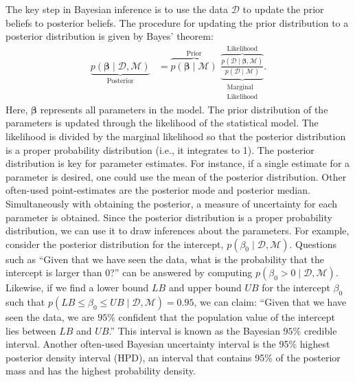 \documentclass[man, mask]{apa7}
\newcommand{\prob}[1]{p\left(#1\right)}
\newcommand{\lik}[1]{p\left(#1\right)}
\newcommand{\data}{\mathcal{D}}
\newcommand{\model}{\mathcal{M}}
\begin{document}
The key step in Bayesian inference is to use the data $\data$ to update the prior beliefs to posterior beliefs.
The procedure for updating the prior distribution to a posterior distribution is given by Bayes' theorem:
\begin{align*}\label{eq:BayesTheorem}
\underbrace{\prob{\bm{\beta} \mid \data , \model}}_{\text{Posterior}}
&=
\overbrace{\prob{\bm{\beta}\mid \model}}^{\text{Prior}}
\,\,
\underbrace{\overbrace{
		\frac{\lik{\data \mid \bm{\beta}, \model}}{\prob{\data \mid \model}}
	}^{\text{Likelihood}}}_{\substack{\text{Marginal}\\ \text{Likelihood}}}.
\end{align*}
Here, $\bm{\beta}$ represents all parameters in the model. The prior distribution of the parameters is updated through the likelihood of the statistical model. The likelihood is divided by the marginal likelihood so that the posterior distribution is a proper probability distribution (i.e., it integrates to 1). The posterior distribution is key for parameter estimates. For instance, if a single estimate for a parameter is desired, one could use the mean of the posterior distribution. Other often-used point-estimates are the posterior mode and posterior median. Simultaneously with obtaining the posterior, a measure of uncertainty for each parameter is obtained. Since the posterior distribution is a proper probability distribution, we can use it to draw inferences about the parameters. For example, consider the posterior distribution for the intercept, $\prob{\beta_0 \mid \data , \model}$. Questions such as ``Given that we have seen the data, what is the probability that the intercept is larger than 0?'' can be answered by computing $\prob{\beta_0 > 0 \mid \data , \model}$. Likewise, if we find a lower bound $LB$ and upper bound $UB$ for the intercept $\beta_0$ such that $\prob{ LB \leq \beta_0 \leq UB \mid \data , \model} = 0.95$, we can claim: ``Given that we have seen the data, we are $95\%$ confident that the population value of the intercept lies between $LB$ and $UB$.'' This interval is known as the Bayesian $95\%$ credible interval. Another often-used Bayesian uncertainty interval is the 95\% highest posterior density interval (HPD), an interval that contains 95\% of the posterior mass and has the highest probability density.
\end{document}
